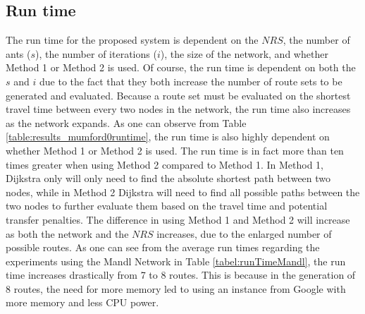 \subsection{Run time}
\label{subsec:runtime}

The run time for the proposed system is dependent on the $NRS$, the number of ants ($s$), the number of iterations ($i$), the size of the network, and whether Method 1 or Method 2 is used.  Of course, the run time is dependent on both the $s$ and $i$ due to the fact that they both increase the number of route sets to be generated and evaluated. Because a route set must be evaluated on the shortest travel time between every two nodes in the network, the run time also increases as the network expands. As one can observe from Table \vref{table:results_mumford0runtime}, the run time is also highly dependent on whether Method 1 or Method 2 is used. The run time is in fact more than ten times greater when using Method 2 compared to Method 1. In Method 1, Dijkstra only will only need to find the absolute shortest path between two nodes, while in Method 2 Dijkstra will need to find all possible paths between the two nodes to further evaluate them based on the travel time and potential transfer penalties. The difference in using Method 1 and Method 2 will increase as both the network and the $NRS$ increases, due to the enlarged number of possible routes. As one can see from the average run times regarding the experiments using the Mandl Network in Table \vref{tabel:runTimeMandl}, the run time increases drastically from 7 to 8 routes. This is because in the generation of 8 routes, the need for more memory led to using an instance from Google with more memory and less CPU power. 

 




